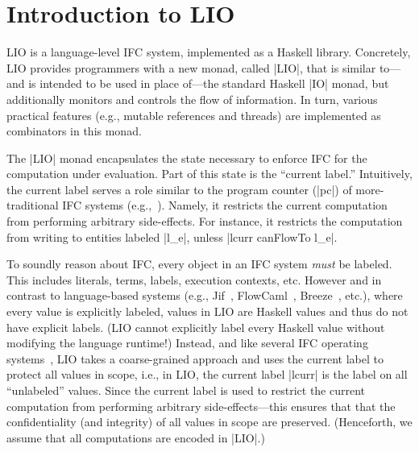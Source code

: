 \section{Introduction to LIO}
\label{sec:background}

LIO is a language-level IFC system, implemented as a Haskell
library.
%
Concretely, LIO provides programmers with a new monad, called |LIO|,
that is similar to---and is intended to be used in place of---the
standard Haskell |IO| monad, but additionally monitors and controls
the flow of information.
%
In turn, various practical features (e.g., mutable references and
threads) are implemented as combinators in this monad.
%

The |LIO| monad encapsulates the state necessary to enforce IFC for
the computation under evaluation.
%
Part of this state is the ``current label.''
%
Intuitively, the current label serves a role similar to the program
counter (|pc|) of more-traditional IFC systems
(e.g.,~\cite{FlowCaml}).
%
Namely, it restricts the current computation from performing arbitrary
side-effects.
%
%
For instance, it restricts the computation from writing to entities
labeled |l_e|, unless |lcurr canFlowTo l_e|.

To soundly reason about IFC, every object in an IFC system \emph{must}
be labeled.
%
This includes literals, terms, labels, execution contexts, etc.
%
However and in contrast to language-based systems (e.g.,
Jif~\cite{myers:jif}, FlowCaml~\cite{FlowCaml}, Breeze~\cite{Breeze},
etc.), where every value is explicitly labeled, values in LIO are
Haskell values and thus do not have explicit labels.
%
(LIO cannot explicitly label every Haskell value without modifying the
language runtime!)
%
Instead, and like several IFC operating
systems~\cite{efstathopoulos:asbestos,zeldovich:histar}, LIO takes a
coarse-grained approach and uses the current label to protect all
values in scope, i.e., in LIO, the current label |lcurr| is the label
on all ``unlabeled'' values.
%
Since the current label is used to restrict the current computation
from performing arbitrary side-effects---this ensures that that the
confidentiality (and integrity) of all values in scope are preserved.
%
(Henceforth, we assume that all computations are encoded in |LIO|.)

